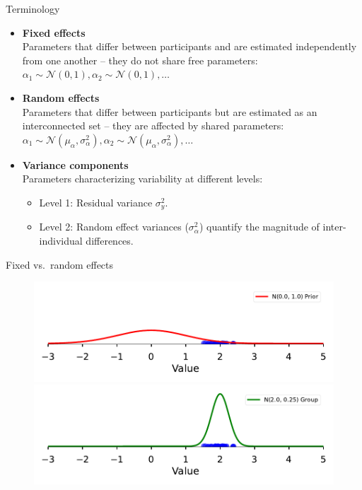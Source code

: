 \documentclass[aspectratio=169]{beamer}
\begin{document}
\begin{frame}{Terminology}
    \begin{itemize}
        \item \textbf{Fixed effects}\\ Parameters that differ between participants and are estimated independently from one another -- they do not share free parameters: $\alpha_1 \sim \mathcal{N}(0, 1), \alpha_2 \sim \mathcal{N}(0, 1), \ldots$
        \pause
        \item \textbf{Random effects}\\ Parameters that differ between participants but are estimated as an interconnected set -- they are affected by shared parameters: $\alpha_1 \sim \mathcal{N}(\mu_{\alpha}, \sigma^2_{\alpha}), \alpha_2 \sim \mathcal{N}(\mu_{\alpha}, \sigma^2_{\alpha}), \ldots$
        \pause
        \item \textbf{Variance components}\\ Parameters characterizing variability at different levels:
        \begin{itemize}
            \item Level 1: Residual variance $\sigma^2_y$.
            \item Level 2: Random effect variances ($\sigma^2_{\alpha}$) quantify the magnitude of inter-individual differences.
        \end{itemize}
    \end{itemize}
\end{frame}

\begin{frame}{Fixed vs.\ random effects}
    \begin{figure}
        \includegraphics[height=0.45\textheight]{figures/fig_003_prior.pdf}
        \includegraphics[height=0.45\textheight]{figures/fig_003_partial.pdf}
    \end{figure}
\end{frame}
\end{document}

